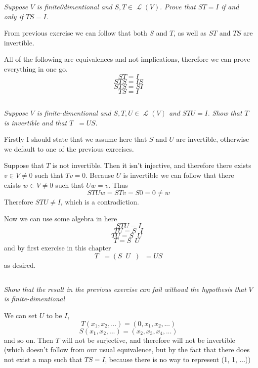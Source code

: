 \documentclass[11pt,oneside,titlepage]{book}
\DeclareMathOperator \map {\mathcal {L}}
\DeclareMathOperator \inv {^{-1}}
\begin{document}
\textit{Suppose $V$ is finite0dimentional and $S, T \in \map(V)$. Prove that $ST = I$ if
  and only if $TS = I$.}

From previous exercise we can follow that both $S$ and $T$, as well as $ST$ and $TS$ are
invertible.

All of the following are equivalences and not  implications, therefore we can prove everything
in one go.
$$ST = I$$
$$STS = IS$$
$$STS = SI$$
$$TS = I$$

\subsection{}

\textit{Suppose $V$ is finite-dimentional and $S, T, U \in \map(V)$ and $STU = I$.
  Show that $T$ is invertible and that $T \inv = US$.}

Firstly I should state that we assume here that $S$ and $U$ are invertible, otherwise we default
to one of the previous exrecises. 

Suppose that $T$ is not invertible. Then it isn't injective, and therefore there exists
$v \in V \neq 0$ such that $Tv = 0$. Because $U$ is invertible we can follow that there exists
$w \in V \neq 0$ such that $Uw = v$. Thus
$$STUw = STv = S0 = 0 \neq w$$
Therefore $STU \neq I$, which is a contradiction.

Now we can use some algebra in here
$$STU = I$$
$$TU = S \inv I$$
$$TU = S \inv U \inv$$
$$T = S \inv U \inv$$
and by first exercise in this chapter
$$T \inv = (S \inv U \inv) \inv = US$$
as desired.

\subsection{}

\textit{Show that the result in the previous exercise can fail withoud the hypothesis that $V$
  is finite-dimentional}

We can set $U$ to be $I$,
$$T(x_1, x_2, ...) = (0, x_1, x_2, ...)$$
$$S(x_1, x_2, ...) = (x_2, x_3, x_4, ...)$$
and so on. Then $T$ will not be surjective, and therefore will not be invertible (which doesn't
follow from our usual equivalence, but by the fact that there does not exist a map such
that $TS = I$, because there is no way to represent (1, 1, ...))

\subsection{}
\end{document}
